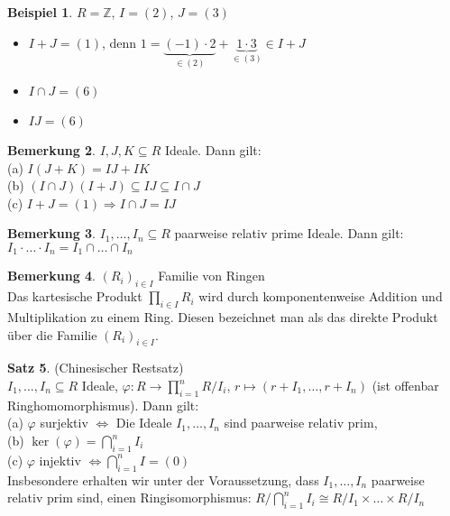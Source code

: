 \documentclass[10pt,a4paper,numbers=endperiod]{scrreprt}
\theoremstyle{definition}
\newtheorem{satz}{Satz}[section]
\newtheorem{bem}[satz]{Bemerkung}
\newtheorem{bsp}[satz]{Beispiel}
\def\ZZ{{\mathbb Z}}
\begin{document}
\begin{bsp}
	$R = \ZZ$, $I = (2)$, $J = (3)$
	\begin{itemize}
		\item $I+J = (1)$, denn $1 = \underbrace{(-1) \cdot 2}_{\in (2)} + \underbrace{1 \cdot 3}_{\in (3)} \in I+J$
		\item $I \cap J = (6)$
		\item $IJ = (6)$
	\end{itemize}
\end{bsp}

\begin{bem}
	$I, J, K \subseteq R$ Ideale. Dann gilt:\\
	(a) $I(J+K) = IJ + IK$\\
	(b) $(I \cap J)(I+J) \subseteq IJ \subseteq I \cap J$\\
	(c) $I+J = (1) \Rightarrow I \cap J = IJ$
\end{bem}

\begin{bem}
	$I_1, \ldots, I_n \subseteq R$ paarweise relativ prime Ideale. Dann gilt:\\
	$I_1 \cdot \ldots \cdot I_n = I_1 \cap \ldots \cap I_n$
\end{bem}

\begin{bem}
	$(R_i)_{i \in I}$ Familie von Ringen\\
	Das kartesische Produkt $\prod\limits_{i \in I} R_i$ wird durch komponentenweise Addition und Multiplikation zu einem Ring. Diesen bezeichnet man als das direkte Produkt über die Familie $(R_i)_{i \in I}$.
\end{bem}

\begin{satz}
	(Chinesischer Restsatz)\\
	$I_1, \ldots, I_n \subseteq R$ Ideale, $\varphi: R \rightarrow \prod\limits_{i = 1}^{n} R/I_i$, $r \mapsto (r+ I_1, \ldots, r+ I_n)$ (ist offenbar Ringhomomorphismus). Dann gilt:\\
	(a) $\varphi$ surjektiv $\Leftrightarrow$ Die Ideale $I_1, \ldots, I_n$ sind paarweise relativ prim,\\
	(b) $\ker(\varphi) = \bigcap\limits_{i=1}^{n} I_i$\\
	(c) $\varphi$ injektiv $\Leftrightarrow \bigcap\limits_{i = 1}^{n} I = (0)$\\
	Insbesondere erhalten wir unter der Voraussetzung, dass $I_1, \ldots, I_n$ paarweise relativ prim sind, einen Ringisomorphismus: $R/\bigcap\limits_{i=1}^n I_i \cong R/I_1 \times \dots
	\times R/I_n$\\
\end{satz}
\end{document}
